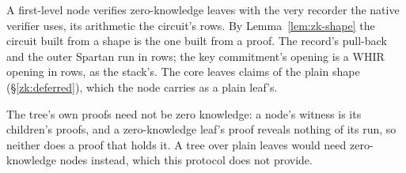 A first-level node verifies zero-knowledge leaves with the very recorder the native verifier uses, its arithmetic the circuit's rows. By Lemma~\ref{lem:zk-shape} the circuit built from a shape is the one built from a proof. The record's pull-back and the outer Spartan run in rows; the key commitment's opening is a WHIR opening in rows, as the stack's. The core leaves claims of the plain shape (\S\ref{zk:deferred}), which the node carries as a plain leaf's.

The tree's own proofs need not be zero knowledge: a node's witness is its children's proofs, and a zero-knowledge leaf's proof reveals nothing of its run, so neither does a proof that holds it. A tree over plain leaves would need zero-knowledge nodes instead, which this protocol does not provide.
